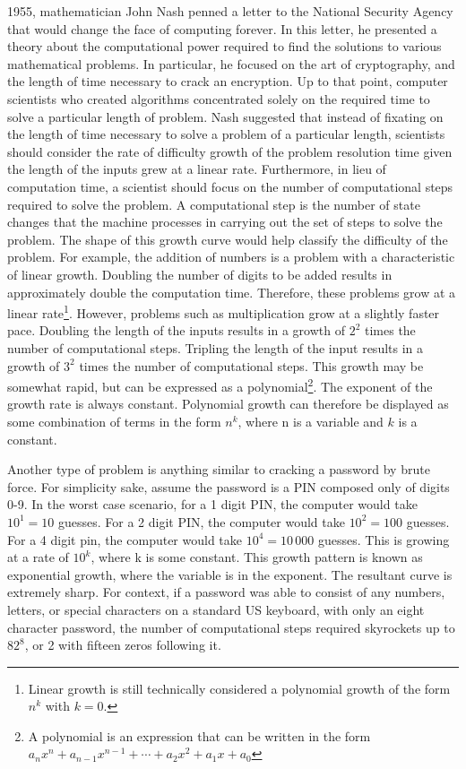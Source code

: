 \documentclass[10pt,journal,compsoc]{IEEEtran}
\begin{document}
 1955, mathematician John Nash penned a letter to the National Security Agency that would change the face of computing forever\cite{NSA}. 
In this letter, he presented a theory about the computational power required to find the solutions to various mathematical problems. In particular, he focused on the art of cryptography, and the length of time necessary to crack an encryption. Up to that point, computer scientists who created algorithms concentrated solely on the required time to solve a particular length of problem. Nash suggested that instead of fixating on the length of time necessary to solve a problem of a particular length, scientists should consider the rate of difficulty growth of the problem resolution time given the length of the inputs grew at a linear rate. Furthermore, in lieu of computation time, a scientist should focus on the number of computational steps required to solve the problem. A computational step is the number of state changes that the machine processes  in carrying out the set of steps to solve the problem. The shape of this growth curve would help classify the difficulty of the problem. For example, the addition of numbers is a problem with a characteristic of linear growth. Doubling the number of digits to be added results in approximately double the computation time. Therefore, these problems grow at a linear rate\footnote{Linear growth is still technically considered a polynomial growth of the form $n^k$ with $k=0$.}.  However, problems such as multiplication grow at a slightly faster pace. Doubling the length of the inputs results in a growth of $2^2$ times the number of computational steps. Tripling the length of the input  results in a growth of $3^2$ times the number of computational steps. This growth may be somewhat rapid, but can be expressed as a polynomial\footnote{A polynomial is an expression that can be written in the form $a_{n}x^{n}+a_{n-1}x^{n-1}+\dotsb +a_{2}x^{2}+a_{1}x+a_{0}$ }. The exponent of the growth rate is always constant. Polynomial growth can therefore be displayed as some combination of terms in the form $n^k$, where n is a variable and $k$ is a constant.

Another type of problem is anything similar to cracking a password by brute force. For simplicity sake, assume the password is a PIN composed only of digits 0-9. In the worst case scenario, for a 1 digit PIN, the computer would take $10^1=10$ guesses. For a 2 digit PIN, the computer would take $10^2 = 100$ guesses. For a 4 digit pin, the computer would take $10^4=10\,000$ guesses. This is growing at a rate of $10^k$, where k is some constant. This growth pattern is known as exponential growth, where the variable is in the exponent. The resultant curve is extremely sharp. For context, if a password was able to consist of any numbers, letters, or special characters on a standard US keyboard, with only an eight character password, the number of computational steps required skyrockets up to $82^8$, or 2 with fifteen zeros following it. 
\end{document}

